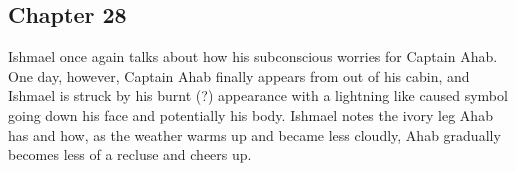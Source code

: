 \subsection{Chapter 28}

Ishmael once again talks about how his subconscious worries for Captain Ahab.
One day, however, Captain Ahab finally appears from out of his cabin, and
Ishmael is struck by his burnt (?) appearance with a lightning like caused
symbol going down his face and potentially his body. Ishmael notes the ivory
leg Ahab has and how, as the weather warms up and became less cloudly, Ahab
gradually becomes less of a recluse and cheers up.

